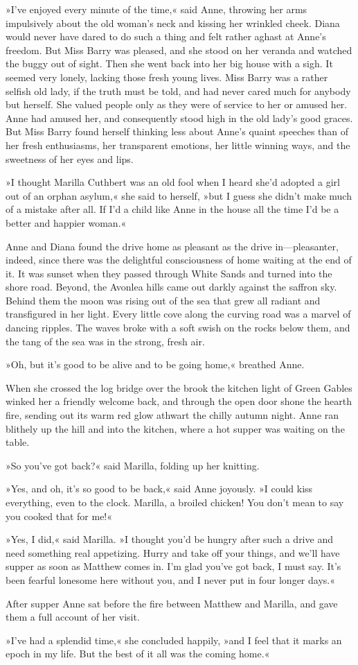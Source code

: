 »I've enjoyed every minute of the time,« said Anne, throwing her arms impulsively about the old woman's neck and kissing her wrinkled cheek. Diana would never have dared to do such a thing and felt rather aghast at Anne's freedom. But Miss Barry was pleased, and she stood on her veranda and watched the buggy out of sight. Then she went back into her big house with a sigh. It seemed very lonely, lacking those fresh young lives. Miss Barry was a rather selfish old lady, if the truth must be told, and had never cared much for anybody but herself. She valued people only as they were of service to her or amused her. Anne had amused her, and consequently stood high in the old lady's good graces. But Miss Barry found herself thinking less about Anne's quaint speeches than of her fresh enthusiasms, her transparent emotions, her little winning ways, and the sweetness of her eyes and lips.

»I thought Marilla Cuthbert was an old fool when I heard she'd adopted a girl out of an orphan asylum,« she said to herself, »but I guess she didn't make much of a mistake after all. If I'd a child like Anne in the house all the time I'd be a better and happier woman.«

Anne and Diana found the drive home as pleasant as the drive in—pleasanter, indeed, since there was the delightful consciousness of home waiting at the end of it. It was sunset when they passed through White Sands and turned into the shore road. Beyond, the Avonlea hills came out darkly against the saffron sky. Behind them the moon was rising out of the sea that grew all radiant and transfigured in her light. Every little cove along the curving road was a marvel of dancing ripples. The waves broke with a soft swish on the rocks below them, and the tang of the sea was in the strong, fresh air.

»Oh, but it's good to be alive and to be going home,« breathed Anne.

When she crossed the log bridge over the brook the kitchen light of Green Gables winked her a friendly welcome back, and through the open door shone the hearth fire, sending out its warm red glow athwart the chilly autumn night. Anne ran blithely up the hill and into the kitchen, where a hot supper was waiting on the table.

»So you've got back?« said Marilla, folding up her knitting.

»Yes, and oh, it's so good to be back,« said Anne joyously. »I could kiss everything, even to the clock. Marilla, a broiled chicken! You don't mean to say you cooked that for me!«

»Yes, I did,« said Marilla. »I thought you'd be hungry after such a drive and need something real appetizing. Hurry and take off your things, and we'll have supper as soon as Matthew comes in. I'm glad you've got back, I must say. It's been fearful lonesome here without you, and I never put in four longer days.«

After supper Anne sat before the fire between Matthew and Marilla, and gave them a full account of her visit.

»I've had a splendid time,« she concluded happily, »and I feel that it marks an epoch in my life. But the best of it all was the coming home.«